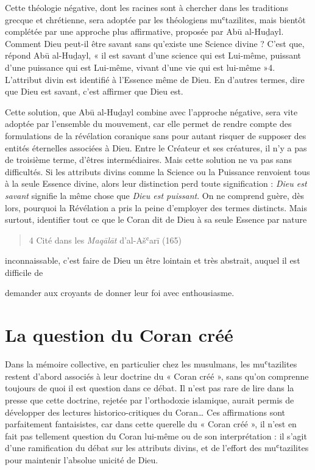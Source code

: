 Cette théologie négative, dont les racines sont à chercher dans les
traditions grecque et chrétienne, sera adoptée par les théologiens
muʿtazilites, mais bientôt complétée par une approche plus affirmative,
proposée par Abū al-Huḏayl. Comment Dieu peut-il être savant sans
qu'existe une Science divine ? C'est que, répond Abū al-Huḏayl, « il est
savant d'une science qui est Lui-même, puissant d'une puissance qui est
Lui-même, vivant d'une vie qui est lui-même »4. L'attribut divin est
identifié à l'Essence même de Dieu. En d'autres termes, dire que Dieu
est savant, c'est affirmer que Dieu est.

Cette solution, que Abū al-Huḏayl combine avec l'approche négative, sera
vite adoptée par l'ensemble du mouvement, car elle permet de rendre
compte des formulations de la révélation coranique sans pour autant
risquer de supposer des entités éternelles associées à Dieu. Entre le
Créateur et ses créatures, il n'y a pas de troisième terme, d'êtres
intermédiaires. Mais cette solution ne va pas sans difficultés. Si les
attributs divins comme la Science ou la Puissance renvoient tous à la
seule Essence divine, alors leur distinction perd toute signification :
\emph{Dieu est savant} signifie la même chose que \emph{Dieu est
puissant}. On ne comprend guère, dès lors, pourquoi la Révélation a pris
la peine d'employer des termes distincts. Mais surtout, identifier tout
ce que le Coran dit de Dieu à sa seule Essence par nature

\begin{quote}
4 Cité dans les \emph{Maqālāt} d'al-Ašʿarī (165)
\end{quote}

inconnaissable, c'est faire de Dieu un être lointain et très abstrait,
auquel il est difficile de

demander aux croyants de donner leur foi avec enthousiasme.

\hypertarget{la-question-du-coran-cruxe9uxe9}{%
\section{La question du Coran
créé}\label{la-question-du-coran-cruxe9uxe9}}

Dans la mémoire collective, en particulier chez les musulmans, les
muʿtazilites restent d'abord associés à leur doctrine du « Coran créé »,
sans qu'on comprenne toujours de quoi il est question dans ce débat. Il
n'est pas rare de lire dans la presse que cette doctrine, rejetée par
l'orthodoxie islamique, aurait permis de développer des lectures
historico-critiques du Coran\ldots{} Ces affirmations sont parfaitement
fantaisistes, car dans cette querelle du « Coran créé », il n'est en
fait pas tellement question du Coran lui-même ou de son interprétation :
il s'agit d'une ramification du débat sur les attributs divins, et de
l'effort des muʿtazilites pour maintenir l'absolue unicité de Dieu.

